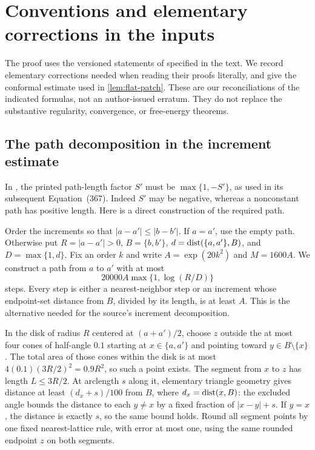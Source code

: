 \section{Conventions and elementary corrections in the inputs}
\label{sec:input-conventions}

The proof uses the versioned statements of \cite{DKLM2026} specified
in the text. We record elementary corrections needed when reading their
proofs literally, and give the conformal estimate used in
\cref{lem:flat-patch}. These are our reconciliations of the indicated
formulas, not an author-issued erratum. They do not replace the
substantive regularity, convergence, or free-energy theorems.

\subsection{The path decomposition in the increment estimate}
\label{sec:input-path}

In \cite[Lemma~21.3]{DKLM2026}, the printed path-length factor $S'$
must be $\max\{1,-S'\}$, as used in its subsequent Equation~(367).
Indeed $S'$ may be negative, whereas a nonconstant path has positive
length. Here is a direct construction of the required path.

Order the increments so that $|a-a'|\le|b-b'|$. If $a=a'$, use
the empty path. Otherwise put $R=|a-a'|>0$, $B=\{b,b'\}$,
$d=\operatorname{dist}(\{a,a'\},B)$, and
$D=\max\{1,d\}$. Fix an order $k$ and write
$A=\exp(20k^2)$ and $M=1600A$. We construct a path from $a$ to $a'$
with at most
\begin{equation}
 20000A\max\{1,\log(R/D)\}
 \label{eq:input-path-bound}
\end{equation}
steps. Every step is either a nearest-neighbor step or an increment
whose endpoint-set distance from $B$, divided by its length, is
at least $A$. This is the alternative needed for the source's
increment decomposition.

In the disk of radius $R$ centered at $(a+a')/2$, choose $z$ outside
the at most four cones of half-angle $0.1$ starting at $x\in\{a,a'\}$ and
pointing toward $y\in B\setminus\{x\}$. The total area of those cones within the
disk is at most $4(0.1)(3R/2)^2=0.9R^2$, so such a point exists.
The segment from $x$ to $z$ has length $L\le3R/2$. At arclength $s$
along it, elementary triangle geometry gives distance at least
$(d_x+s)/100$ from $B$, where $d_x=\operatorname{dist}(x,B)$: the excluded angle
bounds the distance to each $y\ne x$ by a fixed fraction of $|x-y|+s$.
If $y=x$, the distance is exactly $s$, so the same bound holds.
Round all segment points by one fixed nearest-lattice rule, with error
at most one, using the same rounded endpoint $z$ on both segments.

